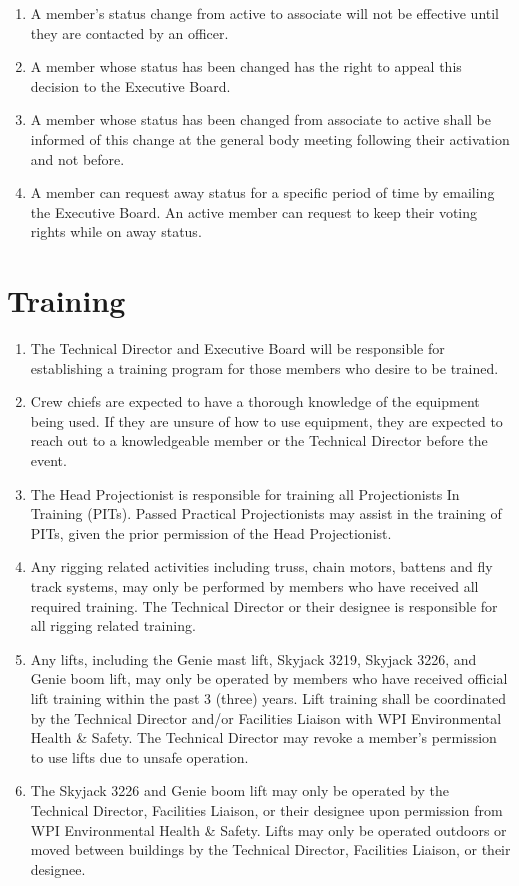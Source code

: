 \documentclass[12pt,letterpaper,oneside]{book}
\begin{document}
\begin{enumerate}

\item A member's status change from active to associate will not be effective until they are contacted by an officer.
\item A member whose status has been changed has the right to appeal this decision to the Executive Board.
\item A member whose status has been changed from associate to active shall be informed of this change at the general body meeting following their activation and not before.
\item A member can request away status for a specific period of time by emailing the Executive Board.  An active member can request to keep their voting rights while on away status.

\end{enumerate}

\section{Training}

\begin{enumerate}

\item The Technical Director and Executive Board will be responsible for establishing a training program for those members who desire to be trained.
\item Crew chiefs are expected to have a thorough knowledge of the equipment being used. If they are unsure of how to use equipment, they are expected to reach out to a knowledgeable member or the Technical Director before the event.
\item The Head Projectionist is responsible for training all Projectionists In Training (PITs).
Passed Practical Projectionists may assist in the training of PITs, given the prior permission of the Head Projectionist.
\item Any rigging related activities including truss, chain motors, battens and fly track systems, may only be performed by members who have received all required training. The Technical Director or their designee is responsible for all rigging related training.
\item Any lifts, including the Genie mast lift, Skyjack 3219, Skyjack 3226, and Genie boom lift, may only be operated by members who have received official lift training within the past 3 (three) years. Lift training shall be coordinated by the Technical Director and/or Facilities Liaison with WPI Environmental Health \& Safety. The Technical Director may revoke a member's permission to use lifts due to unsafe operation.
\item The Skyjack 3226 and Genie boom lift may only be operated by the Technical Director, Facilities Liaison, or their designee upon permission from WPI Environmental Health \& Safety. Lifts may only be operated outdoors or moved between buildings by the Technical Director, Facilities Liaison, or their designee.

\end{enumerate}
\end{document}
